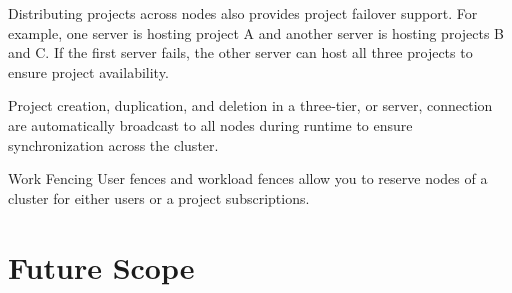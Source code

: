 \documentclass[12pt]{article}
\begin{document}
Distributing projects across nodes also provides project failover support. For example, one server is hosting project A and another server is hosting projects B and C. If the first server fails, the other server can host all three projects to ensure project availability.

Project creation, duplication, and deletion in a three-tier, or server, connection are automatically broadcast to all nodes during runtime to ensure synchronization across the cluster.

Work Fencing
User fences and workload fences allow you to reserve nodes of a cluster for either users or a project subscriptions. 

\newpage
\section{Future Scope}

\newpage
\end{document}
